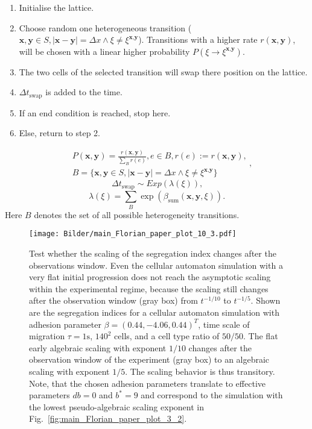\documentclass[10pt,letterpaper]{article}
\newcommand{\figref}[1]{Fig.~\ref{fig:#1}}
\begin{document}
\begin{enumerate}
  \item Initialise the lattice.
  \item Choose random one heterogeneous transition ($\textbf{x},\textbf{y}\in S, |\textbf{x}-\textbf{y}| = \Delta x \wedge \xi\neq\xi^{\textbf{x},\textbf{y}}$). Transitions with a higher rate $r(\textbf{x},\textbf{y})$, will be chosen with a linear higher probability $P(\xi\rightarrow\xi^{\textbf{x},\textbf{y}})$.
  \item The two cells of the selected transition will swap there position on the lattice.
  \item $\Delta t_\text{swap}$ is added to the time.
  \item If an end condition is reached, stop here.
  \item Else, return to step 2.
\end{enumerate}
%
\begin{equation}
  \begin{aligned}
    & P(\textbf{x},\textbf{y}) = \frac{r(\textbf{x},\textbf{y})}{\sum_{B}^{} r(e)}, e\in B, r(e) := r(\textbf{x},\textbf{y})\text{,}\\
    & B = \{\textbf{x},\textbf{y}\in S, |\textbf{x}-\textbf{y}| = \Delta x \wedge \xi\neq\xi^{\textbf{x},\textbf{y}}\}
  \end{aligned}\text{,}
\end{equation}
\begin{equation}
  \Delta t_\text{swap} \sim Exp(\lambda(\xi))\text{,}
\end{equation}
\begin{equation}
  \lambda(\xi) = \sum_{B}^{} \exp(\beta_\text{sum}(\textbf{x},\textbf{y},\xi))\text{.}
\end{equation}
%
Here $B$ denotes the set of all possible heterogeneity transitions.

\begin{figure}[ht!]
 \centering
 \texttt{[image: Bilder/main\_Florian\_paper\_plot\_10\_3.pdf]}
 \caption{Test whether the scaling of the segregation index changes after
  the observations window. Even the cellular automaton simulation with a
  very flat initial progression does not reach the asymptotic scaling within
  the experimental regime, because the scaling still changes after the
  observation window (gray box) from $t^{-1/10}$ to $t^{-1/5}$. Shown are
  the segregation indices for a cellular automaton simulation with
  adhesion parameter $\textbf{$\beta$}=(0.44, -4.06, 0.44)^T$, time
  scale of migration $\tau=1\text{s}$, $140^2$ cells, and a cell type
  ratio of $50/50$. The flat early algebraic scaling with exponent $1/10$
  changes after the observation window of the experiment (gray box) to an
  algebraic scaling with exponent $1/5$. The scaling behavior
  is thus transitory. Note, that the chosen adhesion
  parameters translate to effective parameters $db=0$ and $b^*=9$ and
  correspond to the simulation with the lowest pseudo-algebraic scaling
  exponent in \figref{main_Florian_paper_plot_3_2}.}


 \label{fig:main_Florian_paper_plot_10_3}
\end{figure}
\end{document}

